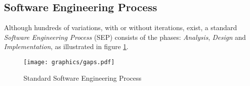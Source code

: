 %
%
%
%
%
%

\subsection{Software Engineering Process}
\label{software_engineering_process_heading}

Although hundreds of variations, with or without iterations, exist, a standard
\emph{Software Engineering Process} (SEP) consists of the phases: \emph{Analysis},
\emph{Design} and \emph{Implementation}, as illustrated in figure
\ref{software_engineering_process_figure}.

\begin{figure}[ht]
    \begin{center}
        \texttt{[image: graphics/gaps.pdf]}
        \caption{Standard Software Engineering Process}
        \label{software_engineering_process_figure}
    \end{center}
\end{figure}
